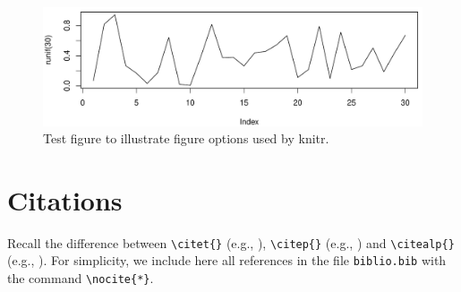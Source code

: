 \begin{figure}
\begin{knitrout}
\color{fgcolor}

{\centering \includegraphics[width=\textwidth-3cm]{figure/ch02_figunnamed-chunk-3-1} 

}


\end{knitrout}
  \caption{Test figure to illustrate figure options used by knitr.}
  \label{f02:1}
\end{figure}


\section{Citations}

Recall the difference between \verb+\citet{}+ (e.g., \citet{Chu:Geor:99}), \verb+\citep{}+ (e.g., \citep{Chu:Geor:99}) and \verb+\citealp{}+ (e.g., \citealp{Chu:Geor:99}).
For simplicity, we include here all references in the file \verb+biblio.bib+ with the command \verb+\nocite{*}+.\nocite{*}


